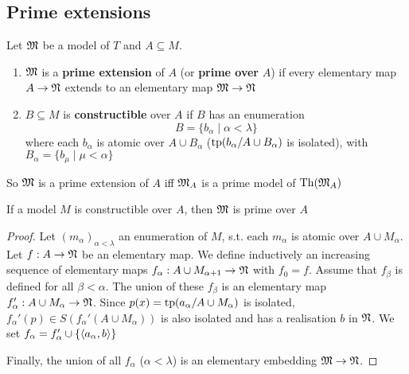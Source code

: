 \documentclass[11pt]{article}
\begin{document}
\subsection{Prime extensions}
\label{sec:org649cf89}
\begin{definition}[]
Let \(\mathfrak{M}\) be a model of \(T\) and \(A\subseteq M\).
\begin{enumerate}
\item \(\mathfrak{M}\) is a \textbf{prime extension} of \(A\) (or \textbf{prime over} \(A\)) if every elementary map \(A\to\mathfrak{N}\)
extends to an elementary map \(\mathfrak{M}\to\mathfrak{N}\)
\begin{center}\end{center}
\item \(B\subseteq M\) is \textbf{constructible} over \(A\) if \(B\) has an enumeration
\begin{equation*}
B=\{b_\alpha\mid\alpha<\lambda\}
\end{equation*}
where each \(b_\alpha\) is atomic over \(A\cup B_\alpha\) (\(\operatorname{tp}(b_\alpha/A\cup B_\alpha)\) is isolated), with \(B_\alpha=\{b_\mu\mid \mu<\alpha\}\)
\end{enumerate}
\end{definition}

So \(\mathfrak{M}\) is a prime extension of \(A\) iff \(\mathfrak{M}_A\) is a prime model of \(\operatorname{Th}(\mathfrak{M}_A)\)

\begin{lemma}[]
\label{lemma5.3.2}
If a model \(M\) is constructible over \(A\), then \(\mathfrak{M}\) is prime over \(A\)
\end{lemma}

\begin{proof}
Let \((m_\alpha)_{\alpha<\lambda}\) an enumeration of \(M\), s.t. each \(m_\alpha\) is atomic over \(A\cup M_\alpha\).
Let \(f:A\to\mathfrak{N}\) be an elementary map. We define inductively an increasing sequence of elementary
maps \(f_\alpha:A\cup M_{\alpha+1}\to\mathfrak{N}\) with \(f_0=f\). Assume that \(f_\beta\) is defined for all \(\beta<\alpha\). The
union of these \(f_\beta\) is an elementary map \(f_\alpha':A\cup M_\alpha\to\mathfrak{N}\). Since \(p(x)=\operatorname{tp}(a_\alpha/A\cup M_\alpha)\) is
isolated, \(f_\alpha'(p)\in S(f_\alpha'(A\cup M_\alpha))\) is also isolated and has a realisation \(b\) in \(\mathfrak{N}\). We
set \(f_\alpha=f_\alpha'\cup\{\langle a_\alpha,b\rangle\}\)

Finally, the union of all \(f_\alpha\) (\(\alpha<\lambda\)) is an elementary embedding \(\mathfrak{M}\to\mathfrak{N}\).
\end{proof}
\end{document}
